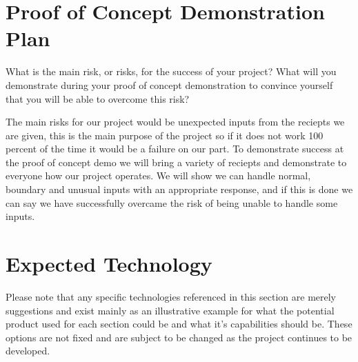 \documentclass{article}
\begin{document}
\section{Proof of Concept Demonstration Plan}

What is the main risk, or risks, for the success of your project?  What will you
demonstrate during your proof of concept demonstration to convince yourself that
you will be able to overcome this risk?

\vspace{0.5cm}

The main risks for our project would be unexpected inputs from the reciepts we are 
given, this is the main purpose of the project so if it does not work 100 percent of the 
time it would be a failure on our part. To demonstrate success at the proof of concept
demo we will bring a variety of reciepts and demonstrate to everyone how our project operates.
We will show we can handle normal, boundary and unusual inputs with an appropriate response, and if 
this is done we can say we have successfully overcame the risk of being unable to handle some inputs. 

\section{Expected Technology}

Please note that any specific technologies referenced in this section are merely suggestions and exist mainly as an illustrative example for what the potential product used for each section could be and what it's capabilities should be. These options are not fixed and are subject to be changed as the project continues to be developed.
\end{document}

